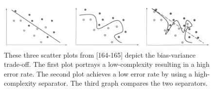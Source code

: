 \begin{figure}[h]
  \centering
  \includegraphics[width=1\textwidth]{./images/biasTradeOff.png}
  \caption{These three scatter plots from \textcite{DataMiningAndPredictiveAnalytics}[164-165] depict the bias-variance trade-off. The first plot portrays a low-complexity resulting in a high error rate. The second plot achieves a low error rate by using a high-complexity separator. The third graph compares the two separators.
  }
  \label{figure:biasTradeOff}
  
\end{figure}







